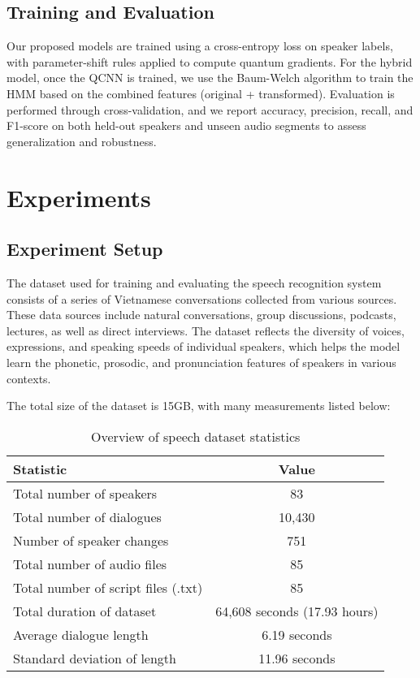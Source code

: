 \documentclass[conference]{IEEEtran}
\begin{document}
\subsection{Training and Evaluation}

Our proposed models are trained using a cross-entropy loss on speaker labels, with parameter-shift rules applied to compute quantum gradients. For the hybrid model, once the QCNN is trained, we use the Baum-Welch algorithm to train the HMM based on the combined features (original + transformed). Evaluation is performed through cross-validation, and we report accuracy, precision, recall, and F1-score on both held-out speakers and unseen audio segments to assess generalization and robustness.


\section{Experiments}
\subsection{Experiment Setup}
The dataset used for training and evaluating the speech recognition system consists of a series of Vietnamese conversations collected from various sources. These data sources include natural conversations, group discussions, podcasts, lectures, as well as direct interviews. The dataset reflects the diversity of voices, expressions, and speaking speeds of individual speakers, which helps the model learn the phonetic, prosodic, and pronunciation features of speakers in various contexts.

The total size of the dataset is 15GB, with many measurements listed below:
\begin{table}[h]
    \centering
    \caption{Overview of speech dataset statistics}
    \begin{tabular}{|l|c|}
        \hline
        \textbf{Statistic}                  & \textbf{Value}               \\
        \hline
        Total number of speakers            & 83                           \\
        Total number of dialogues           & 10,430                       \\
        Number of speaker changes           & 751                          \\
        Total number of audio files         & 85                           \\
        Total number of script files (.txt) & 85                           \\
        Total duration of dataset           & 64,608 seconds (17.93 hours) \\
        Average dialogue length             & 6.19 seconds                 \\
        Standard deviation of length        & 11.96 seconds                \\
        \hline
    \end{tabular}
\end{table}
\end{document}
